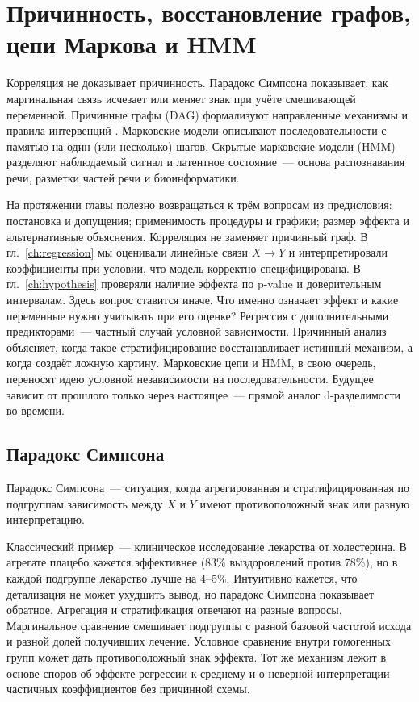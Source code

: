 \chapter{Причинность, восстановление графов, цепи Маркова и HMM}
\label{ch:causality}

Корреляция не доказывает причинность. Парадокс Симпсона показывает, как маргинальная связь исчезает или меняет знак при учёте смешивающей переменной.
Причинные графы (DAG) формализуют направленные механизмы и правила интервенций \citep{pearl2009}. Марковские модели описывают последовательности с памятью на один (или несколько) шагов. Скрытые марковские модели (HMM) \citep{bishop2006} разделяют наблюдаемый сигнал и латентное состояние~--- основа распознавания речи, разметки частей речи и биоинформатики.


На протяжении главы полезно возвращаться к трём вопросам из предисловия: постановка и допущения; применимость процедуры и графики; размер эффекта и альтернативные объяснения. Корреляция не заменяет причинный граф. 
В гл.~\ref{ch:regression} мы оценивали линейные связи $X\to Y$ и интерпретировали коэффициенты при условии, что модель корректно специфицирована. В гл.~\ref{ch:hypothesis} проверяли наличие эффекта по p-value и доверительным интервалам.
Здесь вопрос ставится иначе. Что именно означает эффект и какие переменные нужно учитывать при его оценке?
Регрессия с дополнительными предикторами~--- частный случай условной зависимости. Причинный анализ объясняет, когда такое стратифицирование восстанавливает истинный механизм, а когда создаёт ложную картину.
Марковские цепи и HMM, в свою очередь, переносят идею условной независимости на последовательности. Будущее зависит от прошлого только через настоящее~--- прямой аналог d-разделимости во времени.

\section{Парадокс Симпсона}

\begin{definition}
Парадокс Симпсона~--- ситуация, когда агрегированная и стратифицированная по подгруппам зависимость между $X$ и $Y$ имеют противоположный знак или разную интерпретацию.
\end{definition}

Классический пример~--- клиническое исследование лекарства от холестерина.
В агрегате плацебо кажется эффективнее (83\% выздоровлений против 78\%), но в каждой подгруппе лекарство лучше на 4--5\%.
Интуитивно кажется, что детализация не может ухудшить вывод, но парадокс Симпсона показывает обратное. Агрегация и стратификация отвечают на разные вопросы.
Маргинальное сравнение смешивает подгруппы с разной базовой частотой исхода и разной долей получивших лечение. Условное сравнение внутри гомогенных групп может дать противоположный знак эффекта.
Тот же механизм лежит в основе споров об эффекте регрессии к среднему и о неверной интерпретации частичных коэффициентов без причинной схемы.

